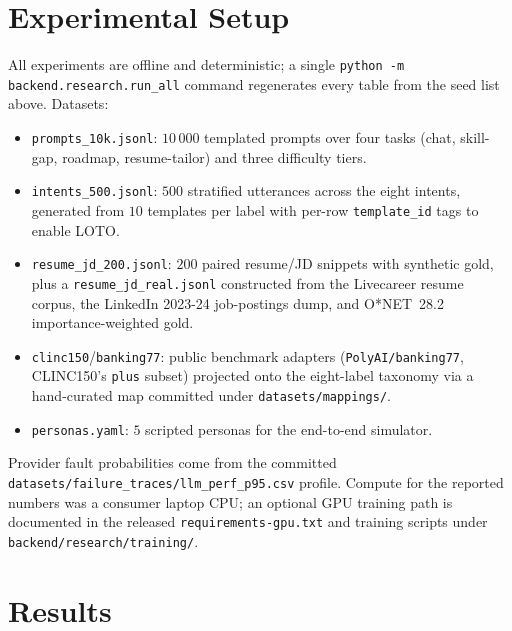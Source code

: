 \documentclass[conference]{IEEEtran}
\begin{document}
\section{Experimental Setup}\label{sec:setup}

All experiments are offline and deterministic; a single
\texttt{python -m backend.research.run\_all} command regenerates every
table from the seed list above. Datasets:
\begin{itemize}
  \item \texttt{prompts\_10k.jsonl}: $10\,000$ templated prompts over
        four tasks (chat, skill-gap, roadmap, resume-tailor) and three
        difficulty tiers.
  \item \texttt{intents\_500.jsonl}: $500$ stratified utterances across
        the eight intents, generated from $10$ templates per label with
        per-row \texttt{template\_id} tags to enable LOTO.
  \item \texttt{resume\_jd\_200.jsonl}: $200$ paired resume/JD snippets
        with synthetic gold, plus a \texttt{resume\_jd\_real.jsonl}
        constructed from the Livecareer resume corpus, the LinkedIn
        2023-24 job-postings dump, and O*NET~28.2
        importance-weighted gold.
  \item \texttt{clinc150}/\texttt{banking77}: public benchmark
        adapters (\texttt{PolyAI/banking77}, CLINC150's \texttt{plus}
        subset) projected onto the eight-label taxonomy via a
        hand-curated map committed under
        \texttt{datasets/mappings/}.
  \item \texttt{personas.yaml}: $5$ scripted personas for the end-to-end
        simulator.
\end{itemize}
Provider fault probabilities come from the committed
\texttt{datasets/failure\_traces/llm\_perf\_p95.csv} profile. Compute
for the reported numbers was a consumer laptop CPU; an optional GPU
training path is documented in the released
\texttt{requirements-gpu.txt} and training scripts under
\texttt{backend/research/training/}.

\section{Results}\label{sec:results}
\end{document}
